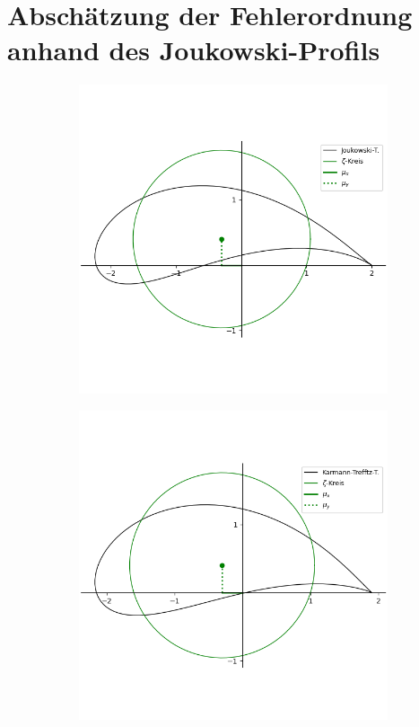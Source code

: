 \newpage
\section{Abschätzung der Fehlerordnung anhand des Joukowski-Profils}
\begin{figure}[]
  \centering
  \begin{subfigure}[b]{0.5\linewidth}
    \centering\includegraphics[scale=0.45]{figures/joukowskitrans.png} 
    \caption{\label{fig:joukowskitrans}}
  \end{subfigure}%
  \begin{subfigure}[b]{0.5\linewidth}
    \centering\includegraphics[scale=0.45]{figures/karmantrefftztrans.png} 

\end{subfigure}
\end{figure}
